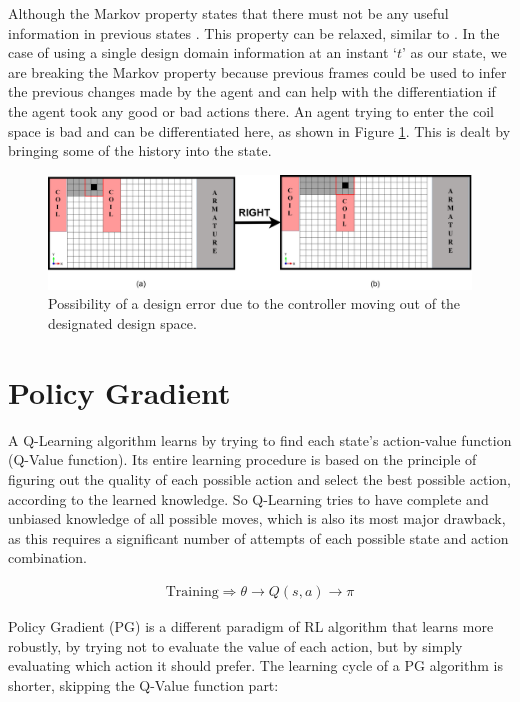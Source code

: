 Although the Markov property states that there must not be any useful information in previous states \parencite{markov1951teoriya}. This property can be relaxed, similar to \cite{silver2017mastering}. In the case of using a single design domain information at an instant `$t$' as our state, we are breaking the Markov property because previous frames could be used to infer the previous changes made by the agent and can help with the differentiation if the agent took any good or bad actions there. An agent trying to enter the coil space is bad and can be differentiated here, as shown in Figure \ref{fig:RL_coil_error2}. This is dealt by bringing some of the history into the state. 

\begin{figure}[h!]
    \centering
    \includegraphics[width=\textwidth]{Figures/Ch_RL/Coil_error.png}
    \caption{Possibility of a design error due to the controller moving out of the designated design space.}
    \label{fig:RL_coil_error2}
\end{figure}

\section{Policy Gradient}

A Q-Learning algorithm learns by trying to find each state’s action-value function (Q-Value function). Its entire learning procedure is based on the principle of figuring out the quality of each possible action and select the best possible action, according to the learned knowledge. So Q-Learning tries to have complete and unbiased knowledge of all possible moves, which is also its most major drawback, as this requires a significant number of attempts of each possible state and action combination. 

\begin{align}
    \text{Training} \Longrightarrow \theta \longrightarrow Q(s,a) \longrightarrow \pi
\end{align}

Policy Gradient (PG) is a different paradigm of RL algorithm that learns more robustly, by trying not to evaluate the value of each action, but by simply evaluating which action it should prefer.
The learning cycle of a PG algorithm is shorter, skipping the Q-Value function part:


